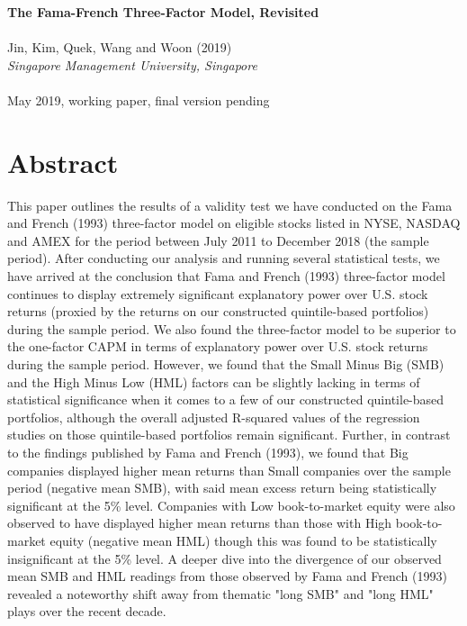 \documentclass[12pt]{article}
\begin{document}
	\thispagestyle{plain}
	\noindent \Large \textbf{The Fama-French Three-Factor Model, Revisited}\\ \\
	\noindent Jin, Kim, Quek, Wang and Woon (2019)\\
	\noindent \normalsize \textit{Singapore Management University, Singapore}\\ \\
	\noindent May 2019, working paper, final version pending
	
		\section{Abstract} %
	
		This paper outlines the results of a validity test we have conducted on the Fama and French (1993) three-factor model on eligible stocks listed in NYSE, NASDAQ and AMEX for the period between July 2011 to December 2018 (the sample period). After conducting our analysis and running several statistical tests, we have arrived at the conclusion that Fama and French (1993) three-factor model continues to display extremely significant explanatory power over U.S. stock returns (proxied by the returns on our constructed quintile-based portfolios) during the sample period. We also found the three-factor model to be superior to the one-factor CAPM in terms of explanatory power over U.S. stock returns during the sample period. However, we found that the Small Minus Big (SMB) and the High Minus Low (HML) factors can be slightly lacking in terms of statistical significance when it comes to a few of our constructed quintile-based portfolios, although the overall adjusted R-squared values of the regression studies on those quintile-based portfolios remain significant. Further, in contrast to the findings published by Fama and French (1993), we found that Big companies displayed higher mean returns than Small companies over the sample period (negative mean SMB), with said mean excess return being statistically significant at the 5\% level. Companies with Low book-to-market equity were also observed to have displayed higher mean returns than those with High book-to-market equity (negative mean HML) though this was found to be statistically insignificant at the 5\% level. A deeper dive into the divergence of our observed mean SMB and HML readings from those observed by Fama and French (1993) revealed a noteworthy shift away from thematic "long SMB" and "long HML" plays over the recent decade.
	
\end{document}
